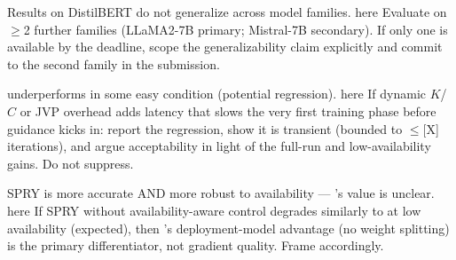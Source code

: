 
\preempt
  {Results on DistilBERT do not generalize across model families.}
  {here} {Evaluate on $\ge$2 further families (LLaMA2-7B primary;
  Mistral-7B secondary). If only one is available by the deadline,
  scope the generalizability claim explicitly and commit to the second
  family in the submission.}

\preempt
  {\sys{} underperforms \fwdllm{} in some easy condition (potential
  regression).} {here} {If dynamic $K$/$C$ or JVP overhead adds
  latency that slows the very first training phase before guidance
  kicks in: report the regression, show it is transient (bounded to
  $\le$[X] iterations), and argue acceptability in light of the
  full-run and low-availability gains. Do not suppress.}

\preempt
  {SPRY is more accurate AND more robust to availability --- \sys{}'s
  value is unclear.} {here} {If SPRY without availability-aware
  control degrades similarly to \fwdllm{} at low availability
  (expected), then \sys{}'s deployment-model advantage (no weight
  splitting) is the primary differentiator, not gradient quality.
  Frame accordingly.}
